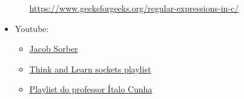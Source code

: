 \documentclass{article}
\begin{document}
\begin{itemize}
\begin{itemize}
                        \url{https://www.geeksforgeeks.org/regular-expressions-in-c/}
            \end{itemize}

      \item Youtube:
            \begin{itemize}
                  \item \href{https://www.youtube.com/@JacobSorber}{Jacob
                              Sorber}
                  \item

                        \href{https://www.youtube.com/watch?v=_lQ-3S4fJ0U&list=PLPyaR5G9aNDvs6TtdpLcVO43_jvxp4emI}{Think
                              and Learn sockets playlist}
                  \item

                        \href{https://www.youtube.com/watch?v=tJ3qNtv0HVs&t=2s}{Playlist do professor
                              Ítalo Cunha}
            \end{itemize}

\end{itemize}
\end{document}
